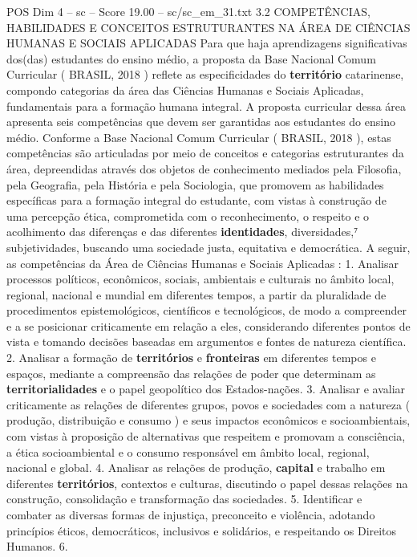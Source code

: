 \begin{textsample}{POS Dim 4 – sc – Score 19.00 – sc/sc\_em\_31.txt}  \label{ex:f4_pos_034}
3.2 COMPETÊNCIAS, HABILIDADES E CONCEITOS ESTRUTURANTES NA ÁREA DE CIÊNCIAS HUMANAS E SOCIAIS APLICADAS Para que haja aprendizagens significativas dos(das) estudantes do ensino médio, a proposta da Base Nacional Comum Curricular ( BRASIL, 2018 ) reflete as especificidades do \textbf{território} catarinense, compondo categorias da área das Ciências Humanas e Sociais Aplicadas, fundamentais para a formação humana integral.
A proposta curricular dessa área apresenta seis competências que devem ser garantidas aos estudantes do ensino médio.
Conforme a Base Nacional Comum Curricular ( BRASIL, 2018 ), estas competências são articuladas por meio de conceitos e categorias estruturantes da área, depreendidas através dos objetos de conhecimento mediados pela Filosofia, pela Geografia, pela História e pela Sociologia, que promovem as habilidades específicas para a formação integral do estudante, com vistas à construção de uma percepção ética, comprometida com o reconhecimento, o respeito e o acolhimento das diferenças e das diferentes \textbf{identidades}, diversidades,⁷ subjetividades, buscando uma sociedade justa, equitativa e democrática.
A seguir, as competências da Área de Ciências Humanas e Sociais Aplicadas : 1.
Analisar processos políticos, econômicos, sociais, ambientais e culturais no âmbito local, regional, nacional e mundial em diferentes tempos, a partir da pluralidade de procedimentos epistemológicos, científicos e tecnológicos, de modo a compreender e a se posicionar criticamente em relação a eles, considerando diferentes pontos de vista e tomando decisões baseadas em argumentos e fontes de natureza científica. 2.
Analisar a formação de \textbf{territórios} e \textbf{fronteiras} em diferentes tempos e espaços, mediante a compreensão das relações de poder que determinam as \textbf{territorialidades} e o papel geopolítico dos Estados-nações. 3.
Analisar e avaliar criticamente as relações de diferentes grupos, povos e sociedades com a natureza ( produção, distribuição e consumo ) e seus impactos econômicos e socioambientais, com vistas à proposição de alternativas que respeitem e promovam a consciência, a ética socioambiental e o consumo responsável em âmbito local, regional, nacional e global. 4.
Analisar as relações de produção, \textbf{capital} e trabalho em diferentes \textbf{territórios}, contextos e culturas, discutindo o papel dessas relações na construção, consolidação e transformação das sociedades. 5.
Identificar e combater as diversas formas de injustiça, preconceito e violência, adotando princípios éticos, democráticos, inclusivos e solidários, e respeitando os Direitos Humanos. 6.

\end{textsample}
